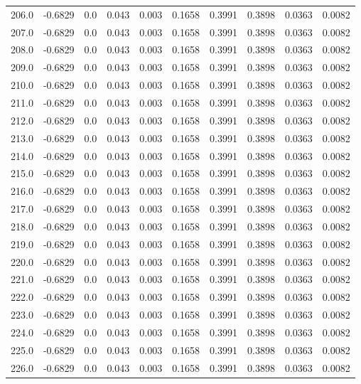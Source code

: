 \begin{longtable}{lrrrrrrrrr}
206.0 & -0.6829 & 0.0 & 0.043 & 0.003 & 0.1658 & 0.3991 & 0.3898 & 0.0363 & 0.0082 \\
207.0 & -0.6829 & 0.0 & 0.043 & 0.003 & 0.1658 & 0.3991 & 0.3898 & 0.0363 & 0.0082 \\
208.0 & -0.6829 & 0.0 & 0.043 & 0.003 & 0.1658 & 0.3991 & 0.3898 & 0.0363 & 0.0082 \\
209.0 & -0.6829 & 0.0 & 0.043 & 0.003 & 0.1658 & 0.3991 & 0.3898 & 0.0363 & 0.0082 \\
210.0 & -0.6829 & 0.0 & 0.043 & 0.003 & 0.1658 & 0.3991 & 0.3898 & 0.0363 & 0.0082 \\
211.0 & -0.6829 & 0.0 & 0.043 & 0.003 & 0.1658 & 0.3991 & 0.3898 & 0.0363 & 0.0082 \\
212.0 & -0.6829 & 0.0 & 0.043 & 0.003 & 0.1658 & 0.3991 & 0.3898 & 0.0363 & 0.0082 \\
213.0 & -0.6829 & 0.0 & 0.043 & 0.003 & 0.1658 & 0.3991 & 0.3898 & 0.0363 & 0.0082 \\
214.0 & -0.6829 & 0.0 & 0.043 & 0.003 & 0.1658 & 0.3991 & 0.3898 & 0.0363 & 0.0082 \\
215.0 & -0.6829 & 0.0 & 0.043 & 0.003 & 0.1658 & 0.3991 & 0.3898 & 0.0363 & 0.0082 \\
216.0 & -0.6829 & 0.0 & 0.043 & 0.003 & 0.1658 & 0.3991 & 0.3898 & 0.0363 & 0.0082 \\
217.0 & -0.6829 & 0.0 & 0.043 & 0.003 & 0.1658 & 0.3991 & 0.3898 & 0.0363 & 0.0082 \\
218.0 & -0.6829 & 0.0 & 0.043 & 0.003 & 0.1658 & 0.3991 & 0.3898 & 0.0363 & 0.0082 \\
219.0 & -0.6829 & 0.0 & 0.043 & 0.003 & 0.1658 & 0.3991 & 0.3898 & 0.0363 & 0.0082 \\
220.0 & -0.6829 & 0.0 & 0.043 & 0.003 & 0.1658 & 0.3991 & 0.3898 & 0.0363 & 0.0082 \\
221.0 & -0.6829 & 0.0 & 0.043 & 0.003 & 0.1658 & 0.3991 & 0.3898 & 0.0363 & 0.0082 \\
222.0 & -0.6829 & 0.0 & 0.043 & 0.003 & 0.1658 & 0.3991 & 0.3898 & 0.0363 & 0.0082 \\
223.0 & -0.6829 & 0.0 & 0.043 & 0.003 & 0.1658 & 0.3991 & 0.3898 & 0.0363 & 0.0082 \\
224.0 & -0.6829 & 0.0 & 0.043 & 0.003 & 0.1658 & 0.3991 & 0.3898 & 0.0363 & 0.0082 \\
225.0 & -0.6829 & 0.0 & 0.043 & 0.003 & 0.1658 & 0.3991 & 0.3898 & 0.0363 & 0.0082 \\
226.0 & -0.6829 & 0.0 & 0.043 & 0.003 & 0.1658 & 0.3991 & 0.3898 & 0.0363 & 0.0082 \\

\end{longtable}
